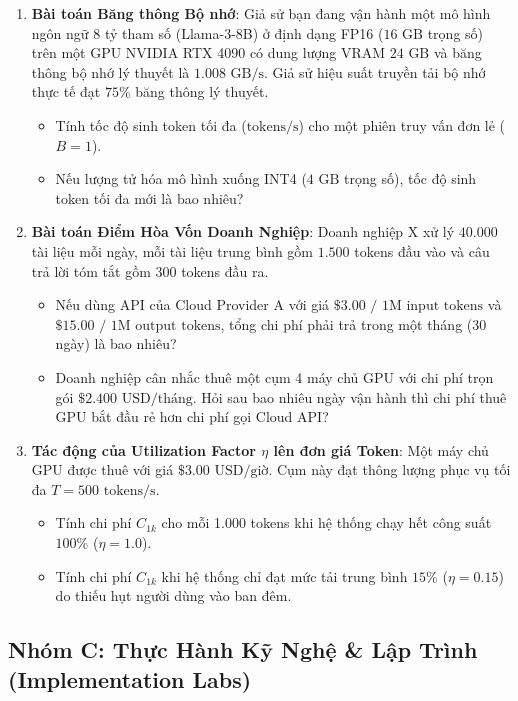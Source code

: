 \begin{enumerate}[label=\textbf{B\arabic*.}]
  \item \textbf{Bài toán Băng thông Bộ nhớ}: Giả sử bạn đang vận hành một mô hình ngôn ngữ 8 tỷ tham số (Llama-3-8B) ở định dạng FP16 ($16\text{ GB}$ trọng số) trên một GPU NVIDIA RTX 4090 có dung lượng VRAM $24\text{ GB}$ và băng thông bộ nhớ lý thuyết là $1.008\text{ GB/s}$. Giả sử hiệu suất truyền tải bộ nhớ thực tế đạt $75\%$ băng thông lý thuyết. 
  \begin{itemize}
    \item[a)] Tính tốc độ sinh token tối đa ($\text{tokens/s}$) cho một phiên truy vấn đơn lẻ ($B=1$).
    \item[b)] Nếu lượng tử hóa mô hình xuống INT4 ($4\text{ GB}$ trọng số), tốc độ sinh token tối đa mới là bao nhiêu?
  \end{itemize}
  \item \textbf{Bài toán Điểm Hòa Vốn Doanh Nghiệp}: Doanh nghiệp X xử lý $40.000$ tài liệu mỗi ngày, mỗi tài liệu trung bình gồm $1.500$ tokens đầu vào và câu trả lời tóm tắt gồm $300$ tokens đầu ra. 
  \begin{itemize}
    \item[a)] Nếu dùng API của Cloud Provider A với giá $\$3.00\text{ / 1M input tokens}$ và $\$15.00\text{ / 1M output tokens}$, tổng chi phí phải trả trong một tháng (30 ngày) là bao nhiêu?
    \item[b)] Doanh nghiệp cân nhắc thuê một cụm 4 máy chủ GPU với chi phí trọn gói $\$2.400\text{ USD/tháng}$. Hỏi sau bao nhiêu ngày vận hành thì chi phí thuê GPU bắt đầu rẻ hơn chi phí gọi Cloud API?
  \end{itemize}
  \item \textbf{Tác động của Utilization Factor $\eta$ lên đơn giá Token}:
  Một máy chủ GPU được thuê với giá $\$3.00\text{ USD/giờ}$. Cụm này đạt thông lượng phục vụ tối đa $T = 500\text{ tokens/s}$.
  \begin{itemize}
    \item[a)] Tính chi phí $C_{1k}$ cho mỗi 1.000 tokens khi hệ thống chạy hết công suất $100\%$ ($\eta = 1.0$).
    \item[b)] Tính chi phí $C_{1k}$ khi hệ thống chỉ đạt mức tải trung bình $15\%$ ($\eta = 0.15$) do thiếu hụt người dùng vào ban đêm.
  \end{itemize}
\end{enumerate}

\subsection{Nhóm C: Thực Hành Kỹ Nghệ \& Lập Trình (Implementation Labs)}

